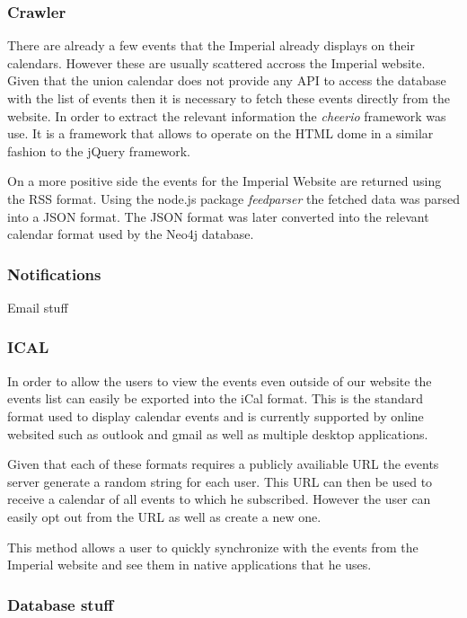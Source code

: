 \documentclass[11pt]{article}
\begin{document}
{\subsubsection {Crawler}

There are already a few events that the Imperial already displays on their calendars.
However these are usually scattered accross the Imperial website.
Given that the union calendar does not provide any API to access the database with the list of events then it is necessary to fetch these events directly from the website.
In order to extract the relevant information the \textit{cheerio} framework was use.
It is a framework that allows to operate on the HTML dome in a similar fashion to the jQuery framework.

On a more positive side the events for the Imperial Website are returned using the RSS format.
Using the node.js package \textit{feedparser} the fetched data was parsed into a JSON format.
The JSON format was later converted into the relevant calendar format used by the Neo4j database.

\subsubsection {Notifications}
	Email stuff
\subsubsection {ICAL}

In order to allow the users to view the events even outside of our website the events list can easily be exported into the iCal format. This is the standard format used to display calendar events and is currently supported by online websited such as outlook and gmail as well as multiple desktop applications.

Given that each of these formats requires a publicly availiable URL the events server generate a random string for each user. This URL can then be used to receive a calendar of all events to which he subscribed. However the user can easily opt out from the URL as well as create a new one.

This method allows a user to quickly synchronize with the events from the Imperial website and see them in native applications that he uses.

\subsubsection {Database stuff}

}
\end{document}
